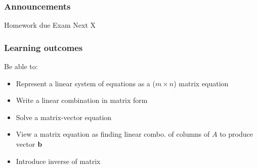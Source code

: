 %




\subsubsection*{Announcements}
\begin{outline}
\1[-] Homework due
\1[-] Exam Next X
\end{outline} 


\subsubsection*{Learning outcomes}
Be able to:
\begin{itemize}
	\item Represent a linear system of equations as a ($m \times n$) matrix equation
	\item Write a linear combination in matrix form 
	\item Solve a matrix-vector equation
	\item View a matrix equation as finding linear combo. of columns of $A$ to produce vector ${\bf b}$
	\item Introduce inverse of matrix
\end{itemize}






